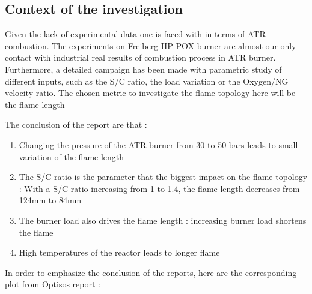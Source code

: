 \subsection{Context of the investigation}

Given the lack of experimental data one is faced with in terms of ATR combustion. The experiments on Freiberg HP-POX burner are almost our only contact with industrial real results of combustion process in ATR burner. Furthermore, a detailed campaign has been made with parametric study of different inputs, such as the S/C ratio, the load variation or the Oxygen/NG velocity ratio. The chosen metric to investigate the flame topology here will be the flame length 

The conclusion of the report are that :
\begin{enumerate}
\item Changing the pressure of the ATR burner from 30 to 50 bars leads to small variation of the flame length
\item The S/C ratio is the parameter that the biggest impact on the flame topology : With a S/C ratio increasing from 1 to 1.4, the flame length decreases from 124mm to 84mm
\item The burner load also drives the flame length : increasing burner load shortens the flame
\item High temperatures of the reactor leads to longer flame
\end{enumerate}

In order to emphasize the conclusion of the reports, here are the corresponding plot from Optisos report :

